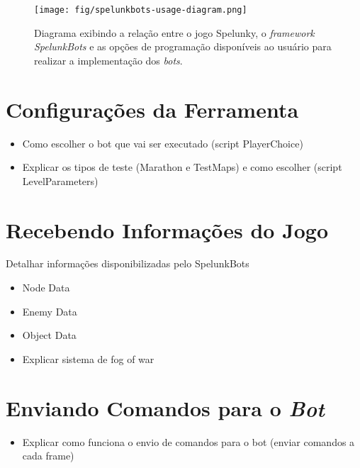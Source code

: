\begin{figure}[htb!]
\centering
\texttt{[image: fig/spelunkbots-usage-diagram.png]}
\label{fig:spelunkbots-usage-diagram}
\caption {Diagrama exibindo a relação
entre o jogo Spelunky, o \textit{framework} \textit{SpelunkBots} e as opções de
programação disponíveis ao usuário para realizar a implementação dos
\textit{bots}.}
\end{figure}


\section{Configurações da Ferramenta}
\begin{mdframed}[backgroundcolor=green!20]
\begin{itemize}
    \item
		Como escolher o bot que vai ser executado (script PlayerChoice)
    \item
		Explicar os tipos de teste (Marathon e TestMaps) e como escolher
		(script LevelParameters)
\end{itemize}
\end{mdframed}


\section{Recebendo Informações do Jogo}
\begin{mdframed}[backgroundcolor=green!20]
Detalhar informações disponibilizadas pelo SpelunkBots
\begin{itemize}
    \item
		Node Data
	\item
		Enemy Data
	\item
		Object Data
	\item
		Explicar sistema de fog of war
\end{itemize}
\end{mdframed}


\section{Enviando Comandos para o \textit{Bot}}
\begin{mdframed}[backgroundcolor=green!20]
\begin{itemize}
    \item
		Explicar como funciona o envio de comandos para o bot (enviar comandos a
		cada frame)
\end{itemize}
\end{mdframed}



